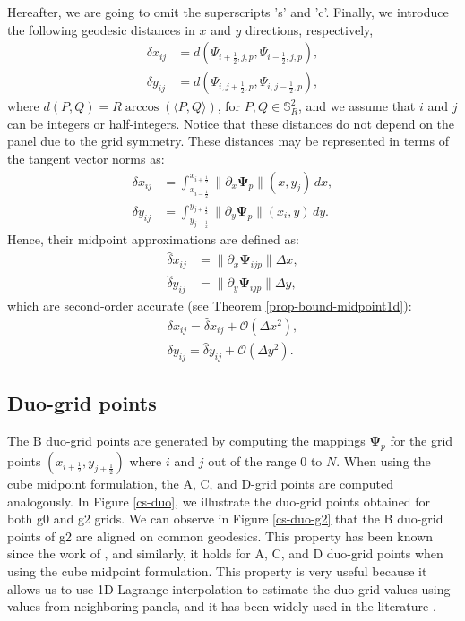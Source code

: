 Hereafter, we are going to omit the superscripts 's' and 'c'.
Finally, we introduce the following geodesic distances in $x$ and $y$ directions, respectively,
\begin{align}
	\label{distcube}
	{\delta} x_{ij} &= d(\Psi_{i+\frac{1}{2},j,p},\Psi_{i-\frac{1}{2},j,p}) ,\\
	{\delta} y_{ij} &= d(\Psi_{i,j+\frac{1}{2},p},\Psi_{i,j-\frac{1}{2},p}),
\end{align}
where $d(P,Q) = R\arccos{(\langle P, Q \rangle)}$, for $P,Q \in \mathbb{S}^2_R$, and we assume that $i$ and $j$ can be integers or half-integers.
Notice that these distances do not depend on the panel due to the grid symmetry.
These distances may be represented in terms of the tangent vector norms as:
\begin{align}
	{\delta} x_{ij} &= 
	\int_{x_{i-\frac{1}{2}}}^{x_{i+\frac{1}{2}}}
	\|\partial_x  \mathbf{\Psi}_{p}\|(x,y_j) \,dx ,\\
	{\delta} y_{ij} &=
	\int_{y_{j-\frac{1}{2}}}^{y_{j+\frac{1}{2}}}
	\|\partial_y \mathbf{\Psi}_{p}\|(x_i,y) \,dy.
\end{align}
Hence, their midpoint approximations are defined as:
\begin{align}
	\label{distcube2}
	\hat{\delta} x_{ij} &= \|\partial_x \mathbf{\Psi}_{ijp} \|\Delta x,\\
	\hat{\delta} y_{ij} &= \|\partial_y \mathbf{\Psi}_{ijp} \|\Delta y,
\end{align}
which are second-order accurate (see Theorem \ref{prop-bound-midpoint1d}):
\begin{align}
\delta x_{ij} = \hat{\delta} x_{ij} + \mathcal{O}(\Delta x^2),\\
\delta y_{ij} = \hat{\delta} y_{ij} + \mathcal{O}(\Delta y^2).
\end{align}
\subsection{Duo-grid points}
\label{duogrid-points}
The B duo-grid points are generated by computing the mappings $\boldsymbol{\Psi}_p$ for the grid points 
$(x_{i+\frac{1}{2}}, y_{j+\frac{1}{2}})$ where $i$ and $j$ out of the range $0$ to $N$. 
When using the cube midpoint formulation, the A, C, and D-grid points are computed analogously.
In Figure \ref{cs-duo}, we illustrate the duo-grid points obtained for both g0 and g2 grids.
We can observe in Figure \ref{cs-duo-g2} that the B duo-grid points of g2 are aligned on common geodesics.
This property has been known since the work of \citet{ronchi:1996}, and similarly, it holds for A, C, and D duo-grid points when using the cube midpoint formulation.
This property is very useful because it allows us to use 1D Lagrange interpolation to estimate the duo-grid values using values 
from neighboring panels, and it has been widely used in the literature \citep{ross:2006, croisille:2013,katta:2015,katta:2015b, chen:2021}.

